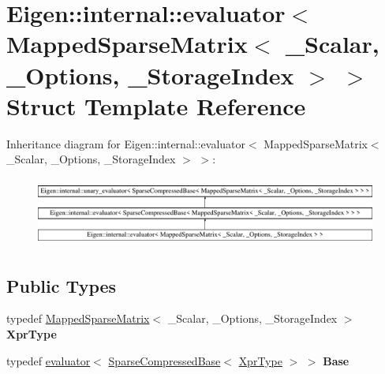 \hypertarget{struct_eigen_1_1internal_1_1evaluator_3_01_mapped_sparse_matrix_3_01___scalar_00_01___options_00_01___storage_index_01_4_01_4}{}\section{Eigen\+::internal\+::evaluator$<$ Mapped\+Sparse\+Matrix$<$ \+\_\+\+Scalar, \+\_\+\+Options, \+\_\+\+Storage\+Index $>$ $>$ Struct Template Reference}
\label{struct_eigen_1_1internal_1_1evaluator_3_01_mapped_sparse_matrix_3_01___scalar_00_01___options_00_01___storage_index_01_4_01_4}
Inheritance diagram for Eigen\+::internal\+::evaluator$<$ Mapped\+Sparse\+Matrix$<$ \+\_\+\+Scalar, \+\_\+\+Options, \+\_\+\+Storage\+Index $>$ $>$\+:\begin{figure}[H]
\begin{center}
\leavevmode
\includegraphics[height=2.323651cm]{struct_eigen_1_1internal_1_1evaluator_3_01_mapped_sparse_matrix_3_01___scalar_00_01___options_00_01___storage_index_01_4_01_4}
\end{center}
\end{figure}
\subsection*{Public Types}
\begin{DoxyCompactItemize}
\item 
\mbox{\label{struct_eigen_1_1internal_1_1evaluator_3_01_mapped_sparse_matrix_3_01___scalar_00_01___options_00_01___storage_index_01_4_01_4_a07fbcc8ad4e483dea87e08136cf39b83}} 
typedef \mbox{\hyperlink{class_eigen_1_1_mapped_sparse_matrix}{Mapped\+Sparse\+Matrix}}$<$ \+\_\+\+Scalar, \+\_\+\+Options, \+\_\+\+Storage\+Index $>$ {\bfseries Xpr\+Type}
\item 
\mbox{\label{struct_eigen_1_1internal_1_1evaluator_3_01_mapped_sparse_matrix_3_01___scalar_00_01___options_00_01___storage_index_01_4_01_4_a5b292dc6d581752e50523f49560fe3d5}} 
typedef \mbox{\hyperlink{struct_eigen_1_1internal_1_1evaluator}{evaluator}}$<$ \mbox{\hyperlink{class_eigen_1_1_sparse_compressed_base}{Sparse\+Compressed\+Base}}$<$ \mbox{\hyperlink{class_eigen_1_1_mapped_sparse_matrix}{Xpr\+Type}} $>$ $>$ {\bfseries Base}
\end{DoxyCompactItemize}

